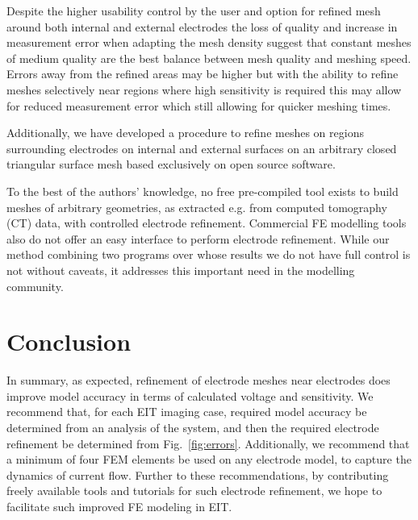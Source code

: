 \documentclass[12pt]{iopart}
\begin{document}
Despite the higher usability control by the user and option for refined mesh around both internal and
external electrodes the loss of quality and increase in measurement error when adapting the mesh density suggest 
that constant meshes of medium quality are the best balance between 
mesh quality and meshing speed. 
Errors away from the refined areas may be higher 
but with the ability to refine meshes selectively near regions where high sensitivity 
is required this may allow for reduced measurement error which still allowing for quicker 
meshing times.

 
Additionally, we have developed a procedure to refine meshes on regions surrounding electrodes 
on internal and external surfaces on an arbitrary closed triangular surface mesh based exclusively on
open source software. 

To the best of the
authors' knowledge, no free pre-compiled tool exists to build meshes of
arbitrary geometries, as extracted e.g. from computed tomography (CT) data,
with controlled electrode refinement. Commercial FE modelling tools also do not offer an
easy interface to perform electrode refinement.
While our method combining two programs over whose results we do not have
full control is not without caveats, it addresses this important need in the
modelling community. 

\section{Conclusion}

In summary, as expected, refinement of electrode meshes near electrodes 
does improve model accuracy in terms of calculated voltage and sensitivity.
We recommend that, for each EIT imaging case, required model accuracy be
determined from an analysis of the system, and then the required electrode refinement 
be determined from Fig.\ \ref{fig:errors}. Additionally, we recommend that
a minimum of four FEM elements be used on any electrode model, to capture
the dynamics of current flow.
Further to these recommendations, by contributing freely available tools and 
tutorials for such electrode
refinement, we hope to facilitate such improved FE modeling in EIT.


  

  
 
\printbibliography
\end{document}
